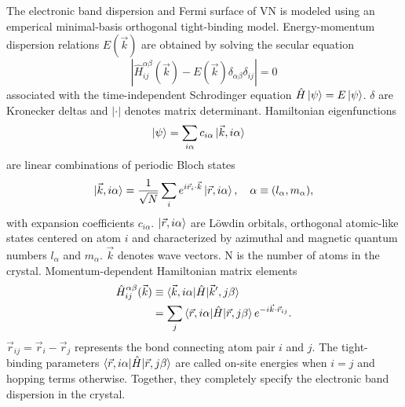 \documentclass[twocolumn,showpacs,preprintnumbers,superscriptaddress,prb,floatfix,aps,10pt]{revtex4-1}
\newcommand*{\ham}{\hat{H}}
\newcommand*{\bloch}{\ket{\vec{k}, i\alpha}}
\newcommand*{\lowdin}{\ket{\vec{r}, i\alpha}}
\newcommand*{\bondvec}{\vec{r}_{ij}}
\begin{document}
The electronic band dispersion and Fermi surface of VN is modeled using an emperical minimal-basis orthogonal tight-binding model. Energy-momentum dispersion relations $E(\vec{k})$ are obtained by solving the secular equation
\begin{equation}
\label{eq:secular}
\left| \ham^{\alpha\beta}_{ij}(\vec{k}) - E(\vec{k})\delta_{\alpha\beta}\delta_{ij} \right| = 0
\end{equation}
%
associated with the time-independent Schrodinger equation $\hat{H} \ket{\psi} = E \ket{\psi}$. $\delta$ are Kronecker deltas and $|\cdot |$ denotes matrix determinant. Hamiltonian eigenfunctions
\begin{align}
\ket{\psi}  &= \sum_{i\alpha} c_{i\alpha} \bloch
\end{align}
%
are linear combinations of periodic Bloch states 
\begin{equation}
\label{eq:bloch}
\bloch = \frac{1}{\sqrt{N}} \sum_i e^{i\vec{r}_i\cdot\vec{k}} \lowdin, 
\quad
\alpha \equiv (l_\alpha,m_\alpha),
\end{equation}
%
with expansion coefficients $c_{i\alpha}$. $\lowdin$ are L\"{o}wdin orbitals, orthogonal atomic-like states centered on atom $i$ and characterized by azimuthal and magnetic quantum numbers $l_\alpha$ and $m_\alpha$. $\vec{k}$ denotes wave vectors. N is the number of atoms in the crystal. Momentum-dependent Hamiltonian matrix elements
\begin{align}
\label{eq:matrix_element}
\ham^{\alpha\beta}_{ij}(\vec{k}) &\equiv \braket{\vec{k},i\alpha | \ham | \vec{k}',j\beta} \\
&= \sum_j \braket{\vec{r},i\alpha | \ham | \vec{r},j\beta} e^{-i \vec{k}\cdot\vec{r}_{ij}} .
\end{align}
%
$\bondvec = \vec{r}_i - \vec{r}_j$ represents the bond connecting atom pair $i$ and $j$. The tight-binding parameters $\braket{\vec{r},i\alpha | \ham | \vec{r},j\beta}$ are called on-site energies when $i=j$ and hopping terms otherwise. Together, they completely specify the electronic band dispersion in the crystal.  
\end{document}
